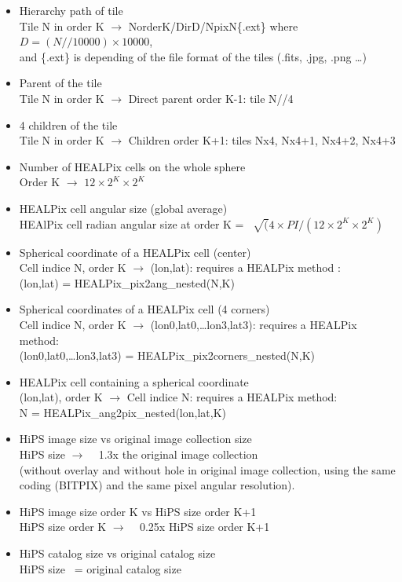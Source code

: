 \documentclass[11pt,a4paper]{ivoa}
\begin{document}
\begin{itemize}
\item Hierarchy path of tile \\
Tile N in order K $\rightarrow$ NorderK/DirD/NpixN\{.ext\}
  where $ D=(N//10000) \times 10000 $,\\
  and \{.ext\} is depending of the file format of the tiles (.fits, .jpg, .png …)
\item Parent of the tile\\
Tile N in order K $\rightarrow$ Direct parent order K-1: tile N//4
\item 4 children of the tile\\
Tile N in order K $\rightarrow$ Children order K+1: tiles Nx4, Nx4+1, Nx4+2, Nx4+3
\item Number of HEALPix cells on the whole sphere\\
Order K $\rightarrow$ $ 12 \times 2^K \times 2^K $
\item HEALPix cell angular size (global average)\\
HEAlPix cell radian angular size at order K =~ $ \sqrt( 4 \times PI / (12 \times 2^K \times 2^K) $
\item Spherical coordinate of a HEALPix cell (center)\\
Cell indice N, order K $\rightarrow$ (lon,lat): requires a HEALPix method :\\
(lon,lat) = HEALPix\_pix2ang\_nested(N,K)
\item Spherical coordinates of a HEALPix cell (4 corners)\\
Cell indice N, order K $\rightarrow$ (lon0,lat0,…lon3,lat3): requires a HEALPix method:\\
(lon0,lat0,…lon3,lat3) = HEALPix\_pix2corners\_nested(N,K)
\item HEALPix cell containing a spherical coordinate\\
(lon,lat), order K $\rightarrow$ Cell indice N: requires a HEALPix method:\\
N = HEALPix\_ang2pix\_nested(lon,lat,K)
\item HiPS image size vs original image collection size\\
HiPS size $\rightarrow$ ~ 1.3x the original image collection \\
(without overlay and without hole in original image collection, using the same coding (BITPIX) and the same pixel angular resolution).
\item HiPS image size order K vs HiPS size order K+1\\
HiPS size order K $\rightarrow$ ~ 0.25x HiPS size order K+1
\item HiPS catalog size vs original catalog size\\
HiPS size ~= original catalog size
\end{itemize}
\end{document}
